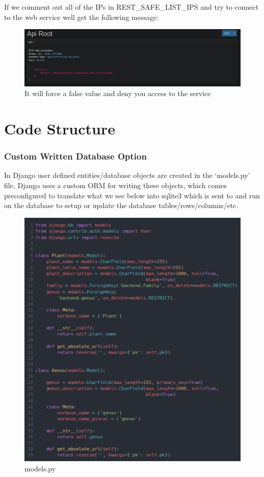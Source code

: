 \documentclass{article}
\begin{document}
        If we comment out all of the IPs in REST\_SAFE\_LIST\_IPS and try to connect to the web service well get the following message:
    \newline
    \begin{figure}[!htb]
       \caption{It will force a false value and deny you access to the service}
       \includegraphics[scale=0.50]{whitelist4}
    \end{figure}

    \pagebreak
	\part{Code Structure}
    \begin{spacing}{4}
    \end{spacing}
    
	\section{Custom Written Database Option}
    In Django user defined entities/database objects are created in the `models.py' file, Django uses a custom ORM for writing these objects, which comes preconfigured to translate what we see below into sqlite3 which is sent to and run on the database to setup or update the database tables/rows/columns/etc.
    
     \begin{figure}[!htb]
        \caption{models.py}
        \centering
        \includegraphics[scale=0.8]{models1}
    \end{figure}
\end{document}
